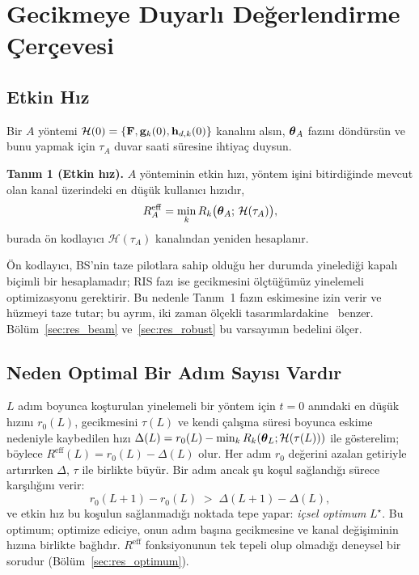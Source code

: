 \section{Gecikmeye Duyarlı Değerlendirme Çerçevesi}
\label{sec:framework}

\subsection{Etkin Hız}
Bir $A$ yöntemi $\mathcal{H}(0)=\{\mathbf{F},\mathbf{g}_k(0),\mathbf{h}_{d,k}(0)\}$ kanalını alsın, $\boldsymbol{\theta}_A$ fazını döndürsün ve bunu yapmak için $\tau_A$ duvar saati süresine ihtiyaç duysun.

\textbf{Tanım 1 (Etkin hız).} $A$ yönteminin etkin hızı, yöntem işini bitirdiğinde mevcut olan kanal üzerindeki en düşük kullanıcı hızıdır,
\begin{equation}
    R^{\mathrm{eff}}_A = \min_k R_k\big(\boldsymbol{\theta}_A;\,\mathcal{H}(\tau_A)\big),
    \label{eq:effective_rate}
\end{equation}
burada ön kodlayıcı $\mathcal{H}(\tau_A)$ kanalından yeniden hesaplanır.

Ön kodlayıcı, BS'nin taze pilotlara sahip olduğu her durumda yinelediği kapalı biçimli bir hesaplamadır; RIS fazı ise gecikmesini ölçtüğümüz yinelemeli optimizasyonu gerektirir. Bu nedenle Tanım~1 fazın eskimesine izin verir ve hüzmeyi taze tutar; bu ayrım, iki zaman ölçekli tasarımlardakine~\cite{Zhao2021TWC} benzer. Bölüm~\ref{sec:res_beam} ve~\ref{sec:res_robust} bu varsayımın bedelini ölçer.

\subsection{Neden Optimal Bir Adım Sayısı Vardır}
$L$ adım boyunca koşturulan yinelemeli bir yöntem için $t=0$ anındaki en düşük hızını $r_0(L)$, gecikmesini $\tau(L)$ ve kendi çalışma süresi boyunca eskime nedeniyle kaybedilen hızı $\Delta(L)=r_0(L)-\min_k R_k(\boldsymbol{\theta}_L;\mathcal{H}(\tau(L)))$ ile gösterelim; böylece $R^{\mathrm{eff}}(L)=r_0(L)-\Delta(L)$ olur. Her adım $r_0$ değerini azalan getiriyle artırırken $\Delta$, $\tau$ ile birlikte büyür. Bir adım ancak şu koşul sağlandığı sürece karşılığını verir:
\begin{equation}
    r_0(L+1)-r_0(L) \;>\; \Delta(L+1)-\Delta(L),
    \label{eq:marginal}
\end{equation}
ve etkin hız bu koşulun sağlanmadığı noktada tepe yapar: \emph{içsel optimum} $L^\star$. Bu optimum; optimize ediciye, onun adım başına gecikmesine ve kanal değişiminin hızına birlikte bağlıdır. $R^{\mathrm{eff}}$ fonksiyonunun tek tepeli olup olmadığı deneysel bir sorudur (Bölüm~\ref{sec:res_optimum}).

